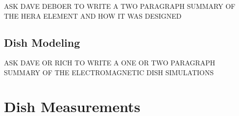 \documentclass{emulateapj}
\begin{document}
ASK DAVE DEBOER TO WRITE A TWO PARAGRAPH SUMMARY OF THE HERA ELEMENT AND HOW IT WAS DESIGNED

\subsection{Dish Modeling}
\label{sec:dishmodels}

ASK DAVE OR RICH TO WRITE A ONE OR TWO PARAGRAPH SUMMARY OF THE ELECTROMAGNETIC DISH SIMULATIONS






\section{Dish Measurements}
\end{document}
